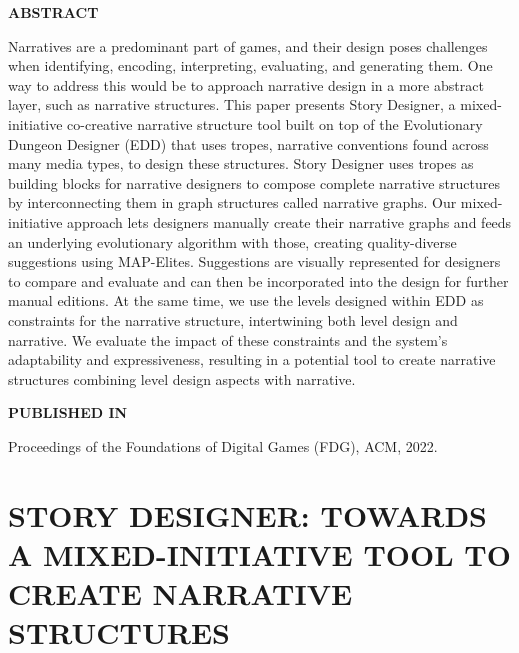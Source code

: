 \graphicspath{{included-papers-tex/paper-11/}}



\normalfont
\textbf{\textsc{ABSTRACT}}

Narratives are a predominant part of games, and their design poses challenges when identifying, encoding, interpreting, evaluating, and generating them. One way to address this would be to approach narrative design in a more abstract layer, such as narrative structures. This paper presents Story Designer, a mixed-initiative co-creative narrative structure tool built on top of the Evolutionary Dungeon Designer (EDD) that uses tropes, narrative conventions found across many media types, to design these structures. Story Designer uses tropes as building blocks for narrative designers to compose complete narrative structures by interconnecting them in graph structures called narrative graphs. Our mixed-initiative approach lets designers manually create their narrative graphs and feeds an underlying evolutionary algorithm with those, creating quality-diverse suggestions using MAP-Elites. Suggestions are visually represented for designers to compare and evaluate and can then be incorporated into the design for further manual editions. At the same time, we use the levels designed within EDD as constraints for the narrative structure, intertwining both level design and narrative. We evaluate the impact of these constraints and the system's adaptability and expressiveness, resulting in a potential tool to create narrative structures combining level design aspects with narrative.

\textbf{\textsc{PUBLISHED IN}}

Proceedings of the Foundations of Digital Games (FDG), ACM, 2022.

\section*{STORY DESIGNER: TOWARDS \\ A MIXED-INITIATIVE TOOL TO CREATE NARRATIVE STRUCTURES}




% 

% 



